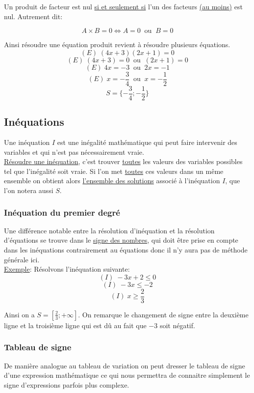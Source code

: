 \documentclass[french]{book}
\begin{document}
\begin{thm}
Un produit de facteur est nul \underline{si et seulement si} l'un des facteurs \underline{(au moins)} est nul. Autrement dit:

$$A \times B = 0 \Longleftrightarrow A=0 \;\; \textrm{ou} \;\; B=0$$

\end{thm}

Ainsi résoudre une équation produit revient à résoudre plusieurs équations.
$$(E) \; (4x+3)(2x+1)=0$$
$$(E) \; (4x+3)=0 \;\;  \textrm{ou} \;\; (2x+1)=0$$
$$(E) \; 4x=-3 \;\;  \textrm{ou} \;\; 2x=-1$$
$$(E) \; x=-\frac{3}{4} \;\;  \textrm{ou} \;\; x=-\frac{1}{2}$$
$$ S = \{  -\frac{3}{4} ; -\frac{1}{2} \} $$

\subsection{Inéquations}
\begin{defn}
Une inéquation $I$ est une inégalité mathématique qui peut faire intervenir des variables et qui n'est pas nécessairement vraie. \\

\underline{Résoudre une inéquation}, c'est trouver \underline{toutes} les valeurs des variables possibles tel que l'inégalité soit vraie. Si l'on met \underline{toutes} ces valeurs dans un même ensemble on obtient alors \underline{l'ensemble des solutions} associé à l'inéquation $I$, que l'on notera aussi $S$. 
\end{defn}

\subsubsection{Inéquation du premier degré}

Une différence notable entre la résolution d'inéquation et la résolution d'équations se trouve dans le  \underline{signe des nombres}, qui doit être prise en compte dans les inéquations contrairement au équations donc il n'y aura pas de méthode générale ici.\\


\underline{Exemple}: Résolvons l'inéquation suivante:
$$(I) \; -3x+2\leq 0$$
$$(I) \; -3x\leq -2$$
$$(I) \; x \geq \frac{2}{3}$$

Ainsi on a $S=[\frac{2}{3};+\infty]$. On remarque le changement de signe entre la deuxième ligne et la troisième ligne qui est dû au fait que $-3$ soit négatif.

\subsubsection{Tableau de signe}
De manière analogue au tableau de variation on peut dresser le tableau de signe d'une expression mathématique ce qui nous permettra de connaitre simplement le signe d'expressions parfois plus complexe.
\end{document}
